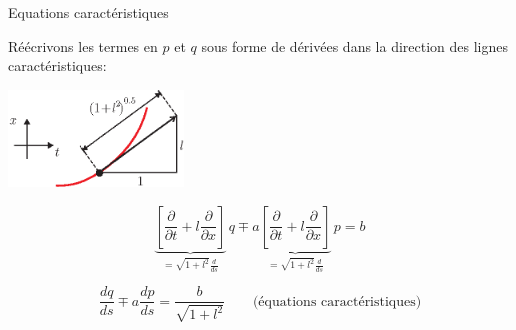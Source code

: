 \documentclass[
mode=present,    %
paper=a4paper,   %
orient=landscape,
display=slides,   %
size=10pt,
style=romain   %
]{powerdot}
\begin{document}
\begin{slide}[toc=]{Equations caractéristiques}

Réécrivons les termes en $p$ et $q$ sous forme de dérivées dans la direction des lignes caractéristiques:

    \centerline{\includegraphics[width=0.35\textwidth]{pente.eps} }

        \begin{equation*}
\underbrace{\left[ \frac{\partial}{\partial t} + l \frac{\partial}{\partial x}  \right]}_{=\displaystyle \sqrt{1+l^2}\frac{d}{ds}}\, q
 \mp a \underbrace{\left[ \frac{\partial}{\partial t} + l \frac{\partial}{\partial x}  \right]}_{=\displaystyle \sqrt{1+l^2}\frac{d}{ds}}\, p = b
        \end{equation*}

\bigskip

        \begin{equation*}
\boxed{ \frac{dq}{ds}
\mp a \frac{dp}{ds} = \frac{b}{\sqrt{1+l^2}} } \qquad\text{(équations caractéristiques)}
        \end{equation*}


\end{slide}
\end{document}
